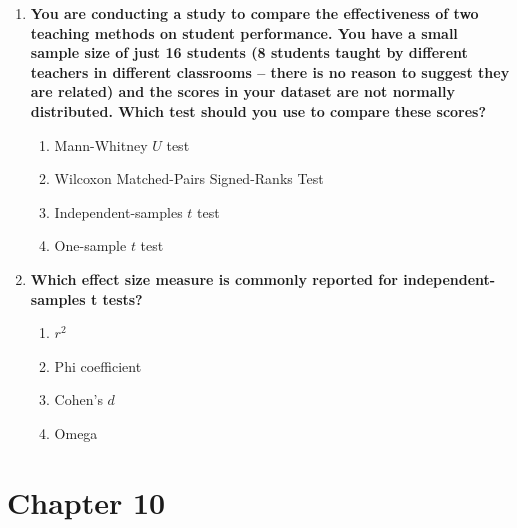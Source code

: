 \documentclass[
  letterpaper,
  DIV=11,
  numbers=noendperiod]{scrreprt}
\begin{document}
\begin{enumerate}
  \begin{enumerate}
  \def\labelenumii{\alph{enumii}.}
  \item
    When you have two independent groups to compare.
  \item
    When you want to compare a single group to a known population mean.
  \item
    When you compare pre- and post-test scores from the same group.
  \item
    When you have categorical data.
  \end{enumerate}
\item
  \textbf{You are conducting a study to compare the effectiveness of two
  teaching methods on student performance. You have a small sample size
  of just 16 students (8 students taught by different teachers in
  different classrooms -- there is no reason to suggest they are
  related) and the scores in your dataset are not normally distributed.
  Which test should you use to compare these scores?}

  \begin{enumerate}
  \def\labelenumii{\alph{enumii}.}
  \item
    Mann-Whitney \(U\) test
  \item
    Wilcoxon Matched-Pairs Signed-Ranks Test
  \item
    Independent-samples \(t\) test
  \item
    One-sample \(t\) test
  \end{enumerate}
\item
  \textbf{Which effect size measure is commonly reported for
  independent-samples t tests?}

  \begin{enumerate}
  \def\labelenumii{\alph{enumii}.}
  \item
    \(r^2\)
  \item
    Phi coefficient
  \item
    Cohen's \(d\)
  \item
    Omega
  \end{enumerate}
\end{enumerate}


\chapter{Chapter 10}\label{chapter-10}

\end{document}
